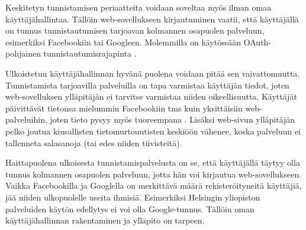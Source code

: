 Keskitetyn tunnistamisen periaatteita voidaan soveltaa myös ilman omaa käyttäjähallintaa. Tällöin web-sovellukseen kirjautuminen vaatii, että käyttäjällä on tunnus tunnistautumisen tarjoavan kolmannen osapuolen palveluun, esimerkiksi Facebookiin tai Googleen. Molemmilla on käytössään OAuth-pohjainen tunnistautumisrajapinta \cite{inside_the_identity_management_game}.

Ulkoistetun käyttäjähallinnan hyvänä puolena voidaan pitää sen vaivattomuutta. Tunnistamista tarjoavilla palveluilla on tapa varmistaa käyttäjän tiedot, joten web-sovelluksen ylläpitäjän ei tarvitse varmistaa niiden oikeellisuutta. Käyttäjät päivittävät tietonsa mielummin Facebookiin tms kuin yksittäisiin web-palveluihin, joten tieto pysyy myös tuoreempana \cite{inside_the_identity_management_game}. Lisäksi web-sivun ylläpitäjän pelko joutua kiusallisten tietomurtouutisten keskiöön vähenee, koska palveluun ei tallenneta salasanoja (tai edes niiden tiivisteitä).

Haittapuolena ulkoisesta tunnistamispalvelusta on se, että käyttäjällä täytyy olla tunnus kolmannen osapuolen palveluun, jotta hän voi kirjautua web-sovellukseen. Vaikka Facebookilla ja Googlella on merkittävä määrä rekisteröityneitä käyttäjiä, jää niiden ulkopuolelle useita ihmisiä. Esimerkiksi Helsingin yliopiston palveluiden käytön edellytys ei voi olla Google-tunnus. Tällöin oman käyttäjähallinnan rakentaminen ja ylläpito on tarpeen.